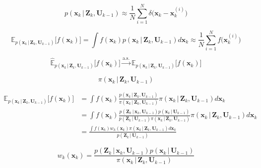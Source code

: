 \begin{equation}
  p(\bm{x}_k\,|\,\bm{Z}_{k}, \bm{U}_{k-1}) \approx \frac{1}{N} \sum^N_{i = 1} \delta\Big(\bm{x}_{k} - \bm{x}^{(i)}_k \Big)
\end{equation}

\begin{equation}
  \mathbb{E}_{p(\bm{x}_k\,|\,\bm{Z}_{k}, \bm{U}_{k-1})}\big[f(\bm{x}_k)\big] = \int f(\bm{x}_k) p(\bm{x}_k\,|\,\bm{Z}_{k}, \bm{U}_{k-1}) d\bm{x}_k \approx \frac{1}{N} \sum^N_{i = 1} f\Big(\bm{x}^{(i)}_k\Big)
\end{equation}

\begin{equation}
  \hat{\mathbb{E}}_{p(\bm{x}_k\,|\,\bm{Z}_{k}, \bm{U}_{k-1})}\big[f(\bm{x}_k)\big] \xrightarrow{\mathrm{a.s.}} \mathbb{E}_{p(\bm{x}_k\,|\,\bm{Z}_{k}, \bm{U}_{k-1})}\big[f(\bm{x}_k)\big]
\end{equation}

\begin{equation}
  \pi(\bm{x}_k\,|\,\bm{Z}_{k}, \bm{U}_{k-1})
\end{equation}


\begin{equation}
\begin{split}
  \mathbb{E}_{p(\bm{x}_k\,|\,\bm{Z}_{k}, \bm{U}_{k-1})}\big[f(\bm{x}_k)\big] &= \int f(\bm{x}_k) \frac{p(\bm{x}_k\,|\,\bm{Z}_{k}, \bm{U}_{k-1})}{\pi(\bm{x}_k\,|\,\bm{Z}_{k}, \bm{U}_{k-1})} \pi(\bm{x}_k\,|\,\bm{Z}_{k}, \bm{U}_{k-1}) d\bm{x}_k \\
  &= \int f(\bm{x}_k) \frac{p(\bm{Z}_k\,|\,\bm{x}_{k}, \bm{U}_{k-1}) p(\bm{x}_{k}\,|\,\bm{U}_{k-1})}{p(\bm{Z}_{k}\,|\,\bm{U}_{k-1}) \pi(\bm{x}_k\,|\,\bm{Z}_{k}, \bm{U}_{k-1})} \pi(\bm{x}_k\,|\,\bm{Z}_{k}, \bm{U}_{k-1}) d\bm{x}_k \\
  &= \frac{\int f(\bm{x}_k) w_k(\bm{x}_k) \pi(\bm{x}_k\,|\,\bm{Z}_{k}, \bm{U}_{k-1}) d\bm{x}_k}{p(\bm{Z}_k\,|\,\bm{U}_{k-1})}
\end{split}
\end{equation}

\begin{equation}
  w_k(\bm{x}_k) = \frac{p(\bm{Z}_k\,|\,\bm{x}_{k}, \bm{U}_{k-1}) p(\bm{x}_{k}\,|\,\bm{U}_{k-1})}{\pi(\bm{x}_k\,|\,\bm{Z}_{k}, \bm{U}_{k-1})}
\end{equation}


